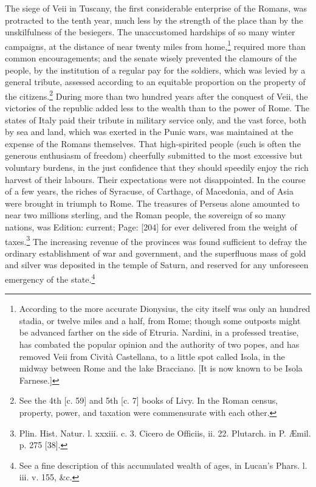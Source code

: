 The siege of Veii in Tuscany, the first considerable enterprise of the Romans, was protracted to the tenth year, much less by the strength of the place than by the unskilfulness of the besiegers. The unaccustomed hardships of so many winter campaigns, at the distance of near twenty miles from home,\footnote{According to the more accurate Dionysius, the city itself was only an hundred stadia, or twelve miles and a half, from Rome; though some outposts might be advanced farther on the side of Etruria. Nardini, in a professed treatise, has combated the popular opinion and the authority of two popes, and has removed Veii from Cività Castellana, to a little spot called Isola, in the midway between Rome and the lake Bracciano. [It is now known to be Isola Farnese.]} required more than common encouragements; and the senate wisely prevented the clamours of the people, by the institution of a regular pay for the soldiers, which was levied by a general tribute, assessed according to an equitable proportion on the property of the citizens.\footnote{See the 4th [c. 59] and 5th [c. 7] books of Livy. In the Roman census, property, power, and taxation were commensurate with each other.} During more than two hundred years after the conquest of Veii, the victories of the republic added less to the wealth than to the power of Rome. The states of Italy paid their tribute in military service only, and the vast force, both by sea and land, which was exerted in the Punic wars, was maintained at the expense of the Romans themselves. That high-spirited people (such is often the generous enthusiasm of freedom) cheerfully submitted to the most excessive but voluntary burdens, in the just confidence that they should speedily enjoy the rich harvest of their labours. Their expectations were not disappointed. In the course of a few years, the riches of Syracuse, of Carthage, of Macedonia, and of Asia were brought in triumph to Rome. The treasures of Perseus alone amounted to near two millions sterling, and the Roman people, the sovereign of so many nations, was Edition: current; Page: [204] for ever delivered from the weight of taxes.\footnote{Plin. Hist. Natur. l. xxxiii. c. 3. Cicero de Officiis, ii. 22. Plutarch. in P. Æmil. p. 275 [38].} The increasing revenue of the provinces was found sufficient to defray the ordinary establishment of war and government, and the superfluous mass of gold and silver was deposited in the temple of Saturn, and reserved for any unforeseen emergency of the state.\footnote{See a fine description of this accumulated wealth of ages, in Lucan\texthebrew{}’s Phars. l. iii. v. 155, \&c.}

